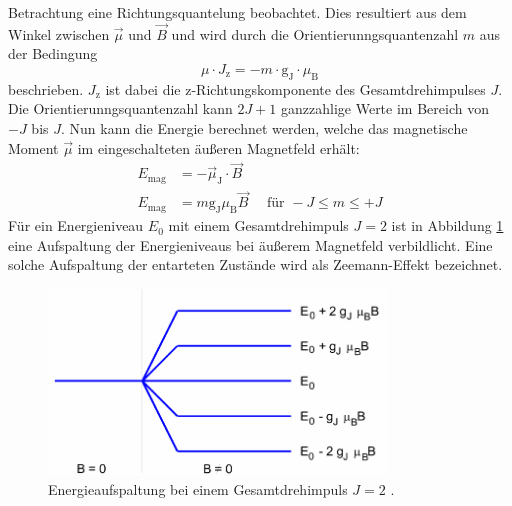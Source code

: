 Betrachtung eine Richtungsquantelung beobachtet. Dies resultiert aus dem Winkel
zwischen $\vec{\mu}$ und $\vec{B}$ und wird durch die
Orientierunngsquantenzahl $m$ aus der Bedingung
\begin{equation}
  \mu \cdot J_\text{z} = - m \cdot \text{g}_\text{J}\cdot \mu_\text{B}
  \label{eqn:bedingung}
\end{equation}
beschrieben. $J_\text{z}$ ist dabei die z-Richtungskomponente des Gesamtdrehimpulses
$J$. Die Orientierunngsquantenzahl kann $2J+1$ ganzzahlige Werte im Bereich von
$-J$ bis $J$.
Nun kann die Energie berechnet werden, welche das magnetische Moment $\vec{\mu}$
im eingeschalteten äußeren Magnetfeld erhält:
\begin{align}
  E_\text{mag} &= -\vec{\mu}_\text{J} \cdot \vec{B} \\
  E_\text{mag} &= m \text{g}_\text{J} \mu_\text{B}\vec{B} \quad \text{ für } -J\leq m\leq+J
  \label{eqn:energie}
\end{align}
Für ein Energieniveau $E_0$ mit einem Gesamtdrehimpuls $J = \num{2}$ ist in Abbildung
\ref{abb:aufspaltung} eine Aufspaltung der Energieniveaus bei äußerem Magnetfeld
verbildlicht. Eine solche Aufspaltung der entarteten Zustände wird als Zeemann-Effekt
bezeichnet.
\begin{figure}[htb]
  \centering
  \includegraphics[width=0.8\textwidth]{images/V27_1.pdf}
  \caption{Energieaufspaltung bei einem Gesamtdrehimpuls $J = \num{2}$ \cite{anleitung}.}
  \label{abb:aufspaltung}
\end{figure}

